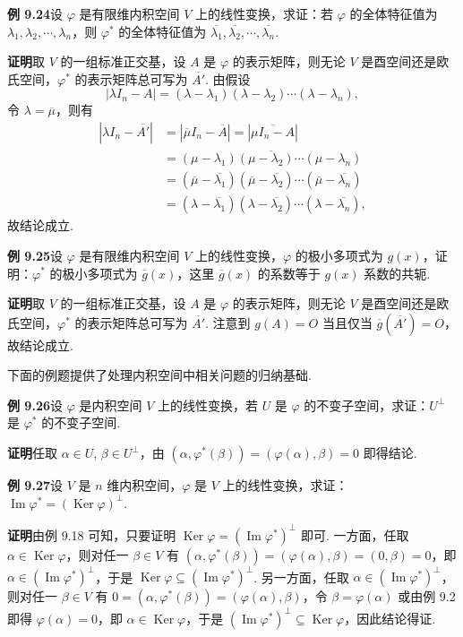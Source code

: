 \documentclass[UTF8,12pt,a4paper,fontset=fandol]{ctexart}
\begin{document}
\noindent\textbf{例 9.24}\quad 设 $\varphi$ 是有限维内积空间 $V$ 上的线性变换，求证：若 $\varphi$ 的全体特征值为 $\lambda_1,\lambda_2,\cdots,\lambda_n$，则 $\varphi^*$ 的全体特征值为 $\overline{\lambda_1},\overline{\lambda_2},\cdots,\overline{\lambda_n}$.

\noindent\textbf{证明}\quad 取 $V$ 的一组标准正交基，设 $A$ 是 $\varphi$ 的表示矩阵，则无论 $V$ 是酉空间还是欧氏空间，$\varphi^*$ 的表示矩阵总可写为 $\overline{A'}$. 由假设
\[
|\lambda I_n-A|=(\lambda-\lambda_1)(\lambda-\lambda_2)\cdots(\lambda-\lambda_n),
\]
令 $\lambda=\overline{\mu}$，则有
\[
\begin{aligned}
|\lambda I_n-\overline{A'}|
&=|\overline{\mu}I_n-\overline{A}|=|\overline{\mu I_n-A}|\\
&=\overline{(\mu-\lambda_1)(\mu-\lambda_2)\cdots(\mu-\lambda_n)}\\
&=(\overline{\mu}-\overline{\lambda_1})(\overline{\mu}-\overline{\lambda_2})\cdots(\overline{\mu}-\overline{\lambda_n})\\
&=(\lambda-\overline{\lambda_1})(\lambda-\overline{\lambda_2})\cdots(\lambda-\overline{\lambda_n}),
\end{aligned}
\]
故结论成立.

\noindent\textbf{例 9.25}\quad 设 $\varphi$ 是有限维内积空间 $V$ 上的线性变换，$\varphi$ 的极小多项式为 $g(x)$，证明：$\varphi^*$ 的极小多项式为 $\overline{g}(x)$，这里 $\overline{g}(x)$ 的系数等于 $g(x)$ 系数的共轭.

\noindent\textbf{证明}\quad 取 $V$ 的一组标准正交基，设 $A$ 是 $\varphi$ 的表示矩阵，则无论 $V$ 是酉空间还是欧氏空间，$\varphi^*$ 的表示矩阵总可写为 $\overline{A'}$. 注意到 $g(A)=O$ 当且仅当 $\overline{g}(\overline{A'})=O$，故结论成立.

下面的例题提供了处理内积空间中相关问题的归纳基础.

\noindent\textbf{例 9.26}\quad 设 $\varphi$ 是内积空间 $V$ 上的线性变换，若 $U$ 是 $\varphi$ 的不变子空间，求证：$U^\perp$ 是 $\varphi^*$ 的不变子空间.

\noindent\textbf{证明}\quad 任取 $\alpha\in U$, $\beta\in U^\perp$，由 $(\alpha,\varphi^*(\beta))=(\varphi(\alpha),\beta)=0$ 即得结论.

\noindent\textbf{例 9.27}\quad 设 $V$ 是 $n$ 维内积空间，$\varphi$ 是 $V$ 上的线性变换，求证：$\operatorname{Im}\varphi^*=(\operatorname{Ker}\varphi)^\perp$.

\noindent\textbf{证明}\quad 由例 9.18 可知，只要证明 $\operatorname{Ker}\varphi=(\operatorname{Im}\varphi^*)^\perp$ 即可. 一方面，任取 $\alpha\in\operatorname{Ker}\varphi$，则对任一 $\beta\in V$ 有 $(\alpha,\varphi^*(\beta))=(\varphi(\alpha),\beta)=(0,\beta)=0$，即 $\alpha\in(\operatorname{Im}\varphi^*)^\perp$，于是 $\operatorname{Ker}\varphi\subseteq(\operatorname{Im}\varphi^*)^\perp$. 另一方面，任取 $\alpha\in(\operatorname{Im}\varphi^*)^\perp$，则对任一 $\beta\in V$ 有 $0=(\alpha,\varphi^*(\beta))=(\varphi(\alpha),\beta)$，令 $\beta=\varphi(\alpha)$ 或由例 9.2 即得 $\varphi(\alpha)=0$，即 $\alpha\in\operatorname{Ker}\varphi$，于是 $(\operatorname{Im}\varphi^*)^\perp\subseteq\operatorname{Ker}\varphi$，因此结论得证.
\end{document}
